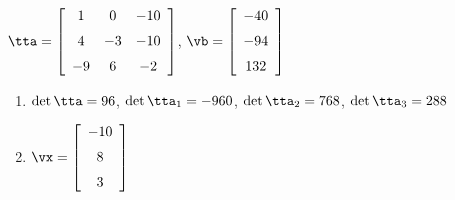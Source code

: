 {$\tta = \left[ \begin {array}{ccc} 1&0&-10\\\noalign{\medskip}4&-3&-10
\\\noalign{\medskip}-9&6&-2\end {array} \right] $,
 \quad
$\vb = \left[ \begin {array}{c} -40\\\noalign{\medskip}-94
\\\noalign{\medskip}132\end {array} \right]$}
{\begin{enumerate}
\item	$\det{\tta} = 96$, $\det{\tta_1} = -960$, $\det{\tta_2} = 768$, $\det{\tta_3} = 288$
\item $\vx = \left[ \begin {array}{c} -10\\\noalign{\medskip}8\\\noalign{\medskip}
3\end {array} \right]$
\end{enumerate}
}

 

 


